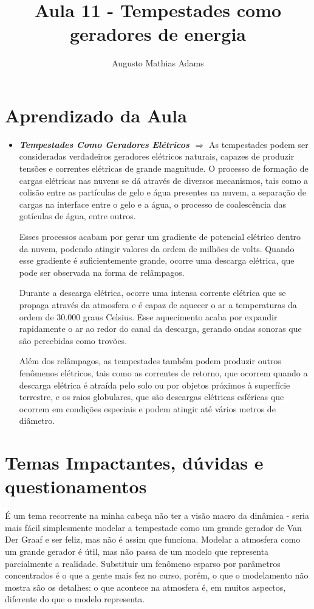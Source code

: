 \documentclass[a4paper, 12pt, onecolumn,singlespacing]{article}
\title{Aula 11 - Tempestades como geradores de energia}
\author[1]{Augusto Mathias Adams}
\affil[1]{augusto.adams@ufpr.br}
\begin{document}
	
	\maketitle
	
	\section{Aprendizado da Aula}
	
	\begin{itemize}
		
		\item \textbf{\textit{Tempestades Como Geradores Elétricos $\Rightarrow$ }}As tempestades podem ser consideradas verdadeiros geradores elétricos naturais, capazes de produzir tensões e correntes elétricas de grande magnitude. O processo de formação de cargas elétricas nas nuvens se dá através de diversos mecanismos, tais como a colisão entre as partículas de gelo e água presentes na nuvem, a separação de cargas na interface entre o gelo e a água, o processo de coalescência das gotículas de água, entre outros.
		
		Esses processos acabam por gerar um gradiente de potencial elétrico dentro da nuvem, podendo atingir valores da ordem de milhões de volts. Quando esse gradiente é suficientemente grande, ocorre uma descarga elétrica, que pode ser observada na forma de relâmpagos.
		
		Durante a descarga elétrica, ocorre uma intensa corrente elétrica que se propaga através da atmosfera e é capaz de aquecer o ar a temperaturas da ordem de 30.000 graus Celsius. Esse aquecimento acaba por expandir rapidamente o ar ao redor do canal da descarga, gerando ondas sonoras que são percebidas como trovões.
		
		Além dos relâmpagos, as tempestades também podem produzir outros fenômenos elétricos, tais como as correntes de retorno, que ocorrem quando a descarga elétrica é atraída pelo solo ou por objetos próximos à superfície terrestre, e os raios globulares, que são descargas elétricas esféricas que ocorrem em condições especiais e podem atingir até vários metros de diâmetro.
	
	\end{itemize}
	
	\section{Temas Impactantes, dúvidas e questionamentos}
	
	É um tema recorrente na minha cabeça não ter a visão macro da dinâmica - seria mais fácil simplesmente modelar a tempestade como um grande gerador de Van Der Graaf e ser feliz, mas não é assim que funciona. Modelar a atmosfera como um grande gerador é útil, mas não passa de um modelo que representa parcialmente a realidade. Substituir um fenômeno esparso por parâmetros concentrados é o que a gente mais fez no curso, porém, o que o modelamento não mostra são os detalhes: o que acontece na atmosfera é, em muitos aspectos, diferente do que o modelo representa.
\end{document}
